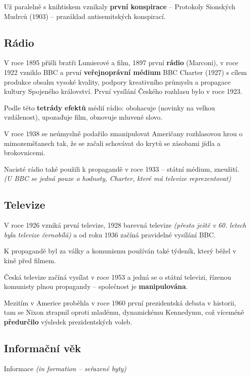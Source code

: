 Už paralelně s knihtiskem vznikaly \textbf{první konspirace} -- Protokoly Sionských Mudrců (1903) -- prazáklad antisemitských konspirací.

\subsection{Rádio}

V roce 1895 přišli bratři Lumierové a film, 1897 první \textbf{rádio} (Marconi), v roce 1922 vzniklo BBC a první \textbf{veřejnoprávní médium} BBC Charter (1927) s cílem produkce obsahu vysoké kvality, podpory kreativního průmyslu a propagace kultury Spojeného království. První vysílání Českého rozhlasu bylo v roce 1923.

Podle této \textbf{tetrády efektů} médií rádio: obohacuje (novinky na velkou vzdálenost), upozaďuje film, obnovuje mluvené slovo.

V roce 1938 se neúmyslně podařilo zmanipulovat Američany rozhlasovou hrou o mimozemšťanech tak, že se začali schovávat do krytů se zásobami jídla a brokovnicemi.

Nacisté rádio také použili k propagandě v roce 1933 -- státní médium, zneužití. \textit{(U BBC se jedná pouze o hodnoty, Charter, které má televize reprezentovat)}

\subsection{Televize}

V roce 1926 vzniká první televize, 1928 barevná televize \textit{(přesto ještě v 60. letech byla televize černobílá)} a od roku 1936 začíná pravidelné vysílání BBC.

K propagandě byl za války a komunismu používán také týdeník, který běžel v kině před filmem.

Česká televize začíná vysílat v roce 1953 a jedná se o státní televizi, řízenou komunisty plnou propagandy -- společnost je \textbf{manipulována}.

Mezitím v Americe proběhla v roce 1960 první prezidentská debata v historii, tam se Nixon ztrapnil oproti mladému, dynamickému Kennedymu, což víceméně \textbf{předurčilo} výsledek prezidentských voleb.

\subsection{Informační věk}

Informace \textit{(in formation -- seřazené byty)}

